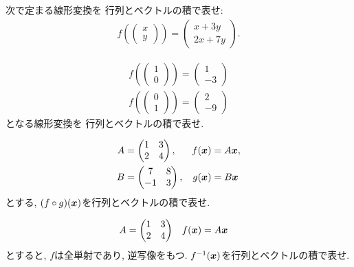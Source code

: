 \begin{quiz}
  次で定まる線形変換を
  行列とベクトルの積で表せ:
  \begin{align*}
    f(\begin{pmatrix}x\\y\end{pmatrix})
      =\begin{pmatrix}x+3y\\2x+7y\end{pmatrix}.
  \end{align*}
\end{quiz}
\begin{quiz}
  \begin{align*}
    f(\begin{pmatrix}1\\0\end{pmatrix})=\begin{pmatrix}1\\-3\end{pmatrix}\\
    f(\begin{pmatrix}0\\1\end{pmatrix})=\begin{pmatrix}2\\-9\end{pmatrix}
  \end{align*}
  となる線形変換を
  行列とベクトルの積で表せ.
\end{quiz}
\begin{quiz}
  \begin{align*}
    A&=\begin{pmatrix}1&3\\2&4\end{pmatrix},
    &f(\boldsymbol{x})&=A\boldsymbol{x},\\
    B&=\begin{pmatrix}7&8\\-1&3\end{pmatrix},
        &g(\boldsymbol{x})&=B\boldsymbol{x}
  \end{align*}
  とする,
  $(f\circ g)(\boldsymbol{x})$を行列とベクトルの積で表せ.
\end{quiz}

\begin{quiz}
  \begin{align*}
    A&=\begin{pmatrix}1&3\\2&4\end{pmatrix}&
    f(\boldsymbol{x})&=A\boldsymbol{x}
  \end{align*}
  とすると,
  $f$は全単射であり, 逆写像をもつ.  
  $f^{-1}(\boldsymbol{x})$を行列とベクトルの積で表せ.
\end{quiz}


